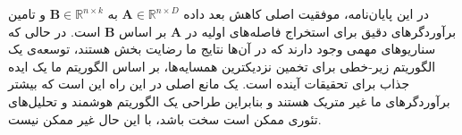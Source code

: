 در این پایان‌نامه، موفقیت اصلی کاهش بعد داده 
$\mathbf{A} \in \mathbb{R}^{n \times D}$
به
$\mathbf{B} \in \mathbb{R}^{n \times k}$
و تامین برآوردگرهای دقیق برای استخراج فاصله‌های اولیه در 
$\mathbf{A}$
بر اساس
$\mathbf{B}$
است. در حالی که سناریوهای مهمی وجود دارند که در آن‌ها نتایج ما رضایت بخش هستند، توسعه‌ی یک الگوریتم زیر-خطی برای تخمین نزدیکترین همسایه‌ها، بر اساس الگوریتم ما یک ایده جذاب برای تحقیقات آینده است. یک مانع اصلی در این راه این است که  بیشتر برآوردگرهای ما غیر متریک هستند و بنابراین طراحی یک الگوریتم هوشمند و تحلیل‌های تئوری ممکن است سخت باشد، با این حال غیر ممکن نیست.





